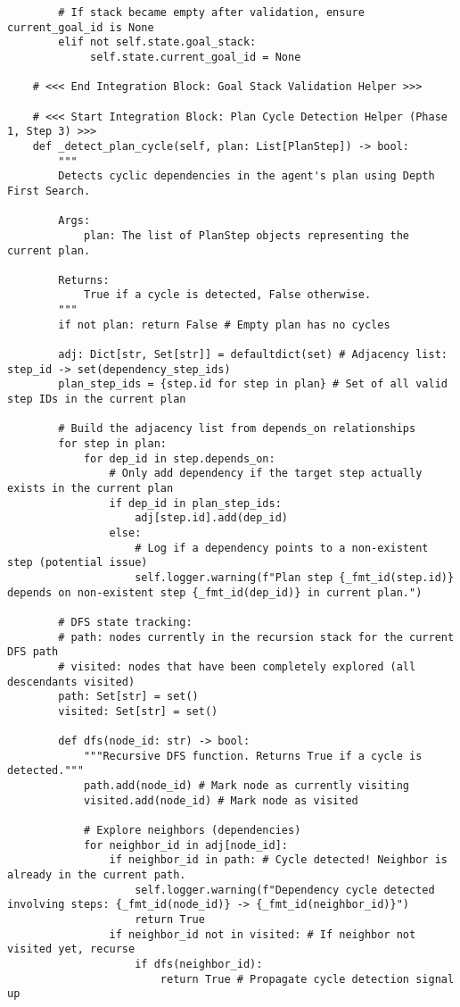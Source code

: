 \documentclass[12pt,a4paper]{article}
\begin{document}
\begin{pageablecode}
\begin{verbatim}
        # If stack became empty after validation, ensure current_goal_id is None
        elif not self.state.goal_stack:
             self.state.current_goal_id = None

    # <<< End Integration Block: Goal Stack Validation Helper >>>

    # <<< Start Integration Block: Plan Cycle Detection Helper (Phase 1, Step 3) >>>
    def _detect_plan_cycle(self, plan: List[PlanStep]) -> bool:
        """
        Detects cyclic dependencies in the agent's plan using Depth First Search.

        Args:
            plan: The list of PlanStep objects representing the current plan.

        Returns:
            True if a cycle is detected, False otherwise.
        """
        if not plan: return False # Empty plan has no cycles

        adj: Dict[str, Set[str]] = defaultdict(set) # Adjacency list: step_id -> set(dependency_step_ids)
        plan_step_ids = {step.id for step in plan} # Set of all valid step IDs in the current plan

        # Build the adjacency list from depends_on relationships
        for step in plan:
            for dep_id in step.depends_on:
                # Only add dependency if the target step actually exists in the current plan
                if dep_id in plan_step_ids:
                    adj[step.id].add(dep_id)
                else:
                    # Log if a dependency points to a non-existent step (potential issue)
                    self.logger.warning(f"Plan step {_fmt_id(step.id)} depends on non-existent step {_fmt_id(dep_id)} in current plan.")

        # DFS state tracking:
        # path: nodes currently in the recursion stack for the current DFS path
        # visited: nodes that have been completely explored (all descendants visited)
        path: Set[str] = set()
        visited: Set[str] = set()

        def dfs(node_id: str) -> bool:
            """Recursive DFS function. Returns True if a cycle is detected."""
            path.add(node_id) # Mark node as currently visiting
            visited.add(node_id) # Mark node as visited

            # Explore neighbors (dependencies)
            for neighbor_id in adj[node_id]:
                if neighbor_id in path: # Cycle detected! Neighbor is already in the current path.
                    self.logger.warning(f"Dependency cycle detected involving steps: {_fmt_id(node_id)} -> {_fmt_id(neighbor_id)}")
                    return True
                if neighbor_id not in visited: # If neighbor not visited yet, recurse
                    if dfs(neighbor_id):
                        return True # Propagate cycle detection signal up


\end{verbatim}
\end{pageablecode}
\end{document}

